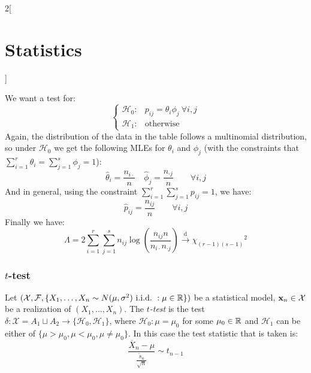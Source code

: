 \documentclass[../../../main.tex]{subfiles}
\begin{document}
\begin{multicols}{2}[\section{Statistics}]
\begin{definition}
    We want a test for:
    $$
      \begin{cases}
        \mathcal{H}_0: & p_{ij}=\theta_i\phi_j\ \forall i,j \\
        \mathcal{H}_1: & \text{otherwise}
      \end{cases}
    $$
    Again, the distribution of the data in the table follows a multinomial distribution, so under $\mathcal{H}_0$ we get the following MLEs for $\theta_i$ and $\phi_j$ (with the constraints that $\sum_{i=1}^r\theta_i=\sum_{j=1}^s\phi_j=1$):
    $$\hat\theta_i=\frac{n_{i\cdot}}{n}\quad\hat\phi_j=\frac{n_{\cdot j}}{n}\qquad\forall i,j$$
    And in general, using the constraint $\sum_{i=1}^r\sum_{j=1}^sp_{ij}=1$, we have: $$\hat{p}_{ij}=\frac{n_{ij}}{n}\qquad\forall i,j$$
    Finally we have: $$\Lambda=2\sum_{i=1}^r\sum_{j=1}^sn_{ij}\log\left(\frac{n_{ij}n}{n_{i\cdot}n_{\cdot j}}\right)\overset{\text{d}}{\longrightarrow}{\chi_{(r-1)(s-1)}}^2$$
  \end{definition}
  \subsubsection{\texorpdfstring{$t$}{t}-test}
  \begin{definition}[$t$-test]
    Let $(\mathcal{X},\mathcal{F},\{X_1,\ldots,X_n\sim N(\mu,\sigma^2)\ \text{i.i.d.\ } : \mu\in\mathbb{R}\})$ be a statistical model, $\boldsymbol{\mathrm{x}}_n\in\mathcal{X}$ be a realization of $(X_1,\ldots,X_n)$. The \emph{$t$-test} is the test $\delta:\mathcal{X}=A_1\sqcup A_2\rightarrow\{\mathcal{H}_0,\mathcal{H}_1\}$, where $\mathcal{H}_0:\mu=\mu_0$ for some $\mu_0\in\mathbb{R}$ and $\mathcal{H}_1$ can be either of $\{\mu>\mu_0,\mu<\mu_0,\mu\ne\mu_0\}$. In this case the test statistic that is taken is: $$\frac{\overline{X}_n-\mu}{\frac{\tilde{s}_n}{\sqrt{n}}}\sim t_{n-1}$$
  \end{definition}

\end{multicols}
\end{document}
